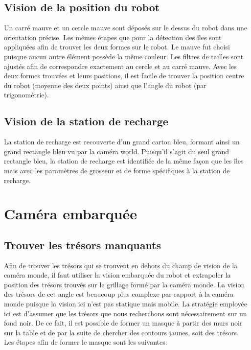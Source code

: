 \subsection{Vision de la position du robot}

Un carré mauve et un cercle mauve sont déposés sur le dessus du robot dans une orientation précise. Les mêmes étapes que pour la détection des îles sont appliquées afin de trouver les deux formes sur le robot. Le mauve fut choisi puisque aucun autre élément possède la même couleur. Les filtres de tailles sont ajustés afin de correspondre exactement au cercle et au carré mauve. Avec les deux formes trouvées et leurs positions, il est facile de trouver la position centre du robot (moyenne des deux points) ainsi que l'angle du robot (par trigonométrie).


\subsection{Vision de la station de recharge}

La station de recharge est recouverte d'un grand carton bleu, formant ainsi un grand rectangle bleu vu par la caméra world. Puisqu'il s'agit du seul grand rectangle bleu, la station de recharge est identifiée de la même façon que les îles mais avec les paramètres de grosseur et de forme spécifiques à la station de recharge.

\section{Caméra embarquée}

\subsection{Trouver les trésors manquants}

Afin de trouver les trésors qui se trouvent en dehors du champ de vision de la caméra monde, il faut utiliser la vision embarquée du robot et extrapoler la position des trésors trouvés sur le grillage formé par la caméra monde. La vision des trésors de cet angle est beaucoup plus complexe par rapport à la caméra monde puisque la vision ici n'est pas statique mais mobile. La stratégie employée ici est d'assumer que les trésors que nous recherchons sont nécessairement sur un fond noir. De ce fait, il est possible de former un masque à partir des murs noir sur la table et de par la suite de chercher des contours jaunes, soit des trésors. Les étapes afin de former le masque sont les suivantes:


